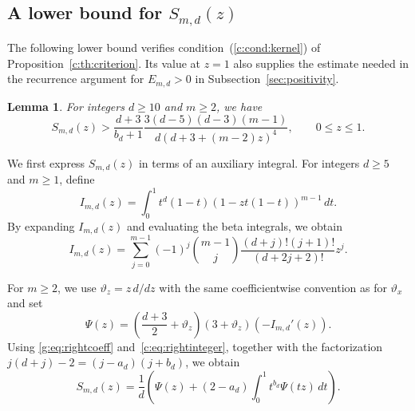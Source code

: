 \documentclass[10pt,a4paper]{article}
\numberwithin{equation}{section}
\newtheorem{lemma}[theorem]{Lemma}
\theoremstyle{remark}\newtheorem{remark}[theorem]{Remark}
\newcommand{\varthetax}{\vartheta_x}
\begin{document}
\subsection{A lower bound for \texorpdfstring{$S_{m,d}(z)$}{S(z)}}\label{sec:kernel}
The following lower bound verifies condition~(\ref{c:cond:kernel}) of
Proposition~\ref{c:th:criterion}. Its value at $z=1$ also supplies the
estimate needed in the recurrence argument for $E_{m,d}>0$ in
Subsection~\ref{sec:positivity}.

\begin{lemma}\label{g:lem:kernel}
For integers $d\ge10$ and $m\ge2$, we have
\begin{equation*}
 S_{m,d}(z)>
 \frac{d+3}{b_d+1}
 \frac{3(d-5)(d-3)(m-1)}{d(d+3+(m-2)z)^4},
 \qquad 0\le z\le1.
\end{equation*}
\end{lemma}

We first express $S_{m,d}(z)$ in terms of an auxiliary integral.
For integers $d\ge5$ and $m\ge1$, define
\[
 I_{m,d}(z)=\int_0^1t^d(1-t)(1-zt(1-t))^{m-1}\,dt.
\]
By expanding $I_{m,d}(z)$ and evaluating the beta integrals, we obtain
\begin{equation}\label{g:eq:rightcoeff}
 I_{m,d}(z)=\sum_{j=0}^{m-1}(-1)^j\binom{m-1}{j}
 \frac{(d+j)!(j+1)!}{(d+2j+2)!}z^j.
\end{equation}

For $m\ge2$, we use $\vartheta_z=z\,d/dz$ with the same coefficientwise convention
as for $\varthetax$ and set
\[
 \Psi(z)=\left(\frac{d+3}{2}+\vartheta_z\right)
 (3+\vartheta_z)(-I_{m,d}'(z)).
\]
Using \eqref{g:eq:rightcoeff} and~\eqref{c:eq:rightinteger}, together with
the factorization $j(d+j)-2=(j-a_d)(j+b_d)$, we obtain
\begin{equation}\label{g:eq:Sop}
 S_{m,d}(z)=\frac1d\left(\Psi(z)
 +(2-a_d)\int_0^1t^{b_d}\Psi(tz)\,dt\right).
\end{equation}
\end{document}
